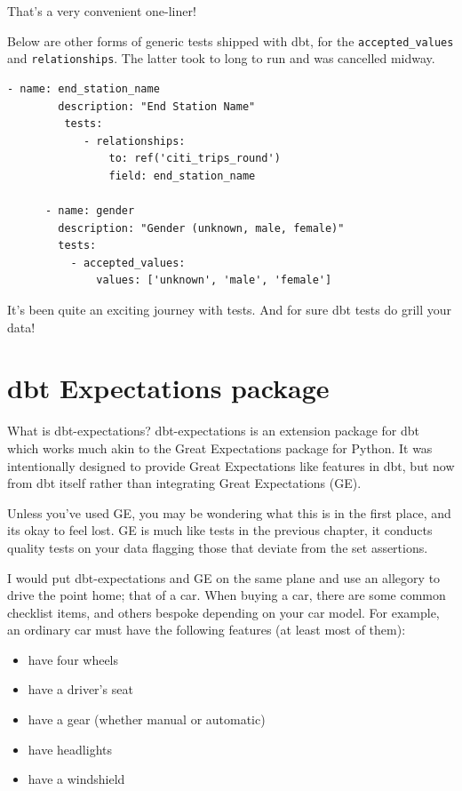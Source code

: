 \documentclass[
]{book}
\providecommand{\tightlist}{%
  \setlength{\itemsep}{0pt}\setlength{\parskip}{0pt}}
\begin{document}
That's a very convenient one-liner!

Below are other forms of generic tests shipped with dbt, for the \texttt{accepted\_values} and \texttt{relationships}. The latter took to long to run and was cancelled midway.

\begin{verbatim}
- name: end_station_name
        description: "End Station Name"
         tests:
            - relationships:
                to: ref('citi_trips_round')
                field: end_station_name

      - name: gender
        description: "Gender (unknown, male, female)"
        tests:
          - accepted_values:
              values: ['unknown', 'male', 'female']
\end{verbatim}

It's been quite an exciting journey with tests. And for sure dbt tests do grill your data!

\hypertarget{dbt-expectations-package}{%
\chapter{dbt Expectations package}\label{dbt-expectations-package}}

What is dbt-expectations? dbt-expectations is an extension package for dbt which works much akin to the Great Expectations package for Python. It was intentionally designed to provide Great Expectations like features in dbt, but now from dbt itself rather than integrating Great Expectations (GE).

Unless you've used GE, you may be wondering what this is in the first place, and its okay to feel lost. GE is much like tests in the previous chapter, it conducts quality tests on your data flagging those that deviate from the set assertions.

I would put dbt-expectations and GE on the same plane and use an allegory to drive the point home; that of a car. When buying a car, there are some common checklist items, and others bespoke depending on your car model. For example, an ordinary car must have the following features (at least most of them):

\begin{itemize}
\tightlist
\item
  have four wheels
\item
  have a driver's seat
\item
  have a gear (whether manual or automatic)
\item
  have headlights
\item
  have a windshield
\end{itemize}
\end{document}
